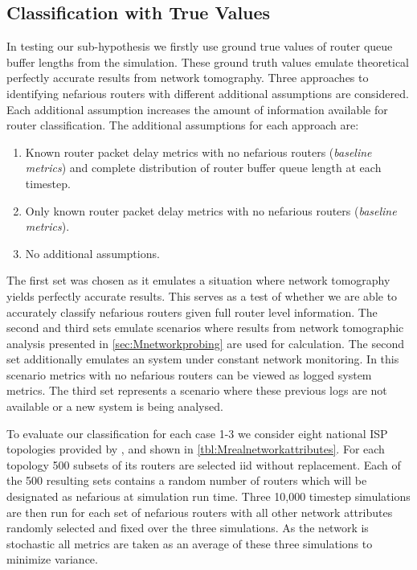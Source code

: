   \subsection{Classification with True Values}
  \label{ssec:MTruevalues}
  In testing our sub-hypothesis we firstly use ground true values of router queue buffer lengths from the simulation. These ground truth values emulate theoretical perfectly accurate results from network tomography. Three approaches to identifying nefarious routers with different additional assumptions are considered. Each additional assumption increases the amount of information available for router classification. The additional assumptions for each approach are:
  \begin{enumerate}
      \item Known router packet delay metrics with no nefarious routers (\textit{baseline metrics}) and complete distribution of router buffer queue length at each timestep.
      \item Only known router packet delay metrics with no nefarious routers (\textit{baseline metrics}).
      \item No additional assumptions.
  \end{enumerate}
  The first set was chosen as it emulates a situation where network tomography yields perfectly accurate results. This serves as a test of whether we are able to accurately classify nefarious routers given full router level information. The second and third sets emulate scenarios where results from network tomographic analysis presented in \cref{sec:Mnetworkprobing} are used for calculation. The second set additionally emulates an system under constant network monitoring. In this scenario metrics with no nefarious routers can be viewed as logged system metrics. The third set represents a scenario where these previous logs are not available or a new system is being analysed.\par
  To evaluate our classification for each case 1-3 we consider eight national ISP topologies provided by \cite{orlowski_sndlib_2007}, \cite{knight_internet_2011} and shown in \cref{tbl:Mrealnetworkattributes}. For each topology 500 subsets of its routers are selected iid without replacement. Each of the 500 resulting sets contains a random number of routers which will be designated as nefarious at simulation run time. Three 10,000 timestep simulations are then run for each set of nefarious routers with all other network attributes randomly selected and fixed over the three simulations. As the network is stochastic all metrics are taken as an average of these three simulations to minimize variance.\par
